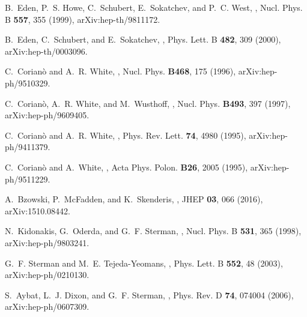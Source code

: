 \documentclass[a4paper,11pt,openright,twoside]{book}
\numberwithin{equation}{section}
\begin{document}
{{\begin{thebibliography}{100}
	B.~Eden, P.~S. Howe, C.~Schubert, E.~Sokatchev, and P.~C. West,
	,
	\newblock Nucl. Phys. B {\bf 557}, 355 (1999), arXiv:hep-th/9811172.
	
	B.~Eden, C.~Schubert, and E.~Sokatchev,
	,
	\newblock Phys. Lett. B {\bf 482}, 309 (2000), arXiv:hep-th/0003096.
	
	C.~Corian\`o and A.~R. White,
	,
	\newblock Nucl. Phys. {\bf B468}, 175 (1996), arXiv:hep-ph/9510329.
	
	C.~Corian\`o, A.~R. White, and M.~Wusthoff,
	,
	\newblock Nucl. Phys. {\bf B493}, 397 (1997), arXiv:hep-ph/9609405.
	
	C.~Corian\`o and A.~R. White,
	,
	\newblock Phys. Rev. Lett. {\bf 74}, 4980 (1995), arXiv:hep-ph/9411379.
	
	C.~Corian\`o and A.~White,
	,
	\newblock Acta Phys. Polon. {\bf B26}, 2005 (1995), arXiv:hep-ph/9511229.
	
	A.~Bzowski, P.~McFadden, and K.~Skenderis,
	,
	\newblock JHEP {\bf 03}, 066 (2016), arXiv:1510.08442.
	
	N.~Kidonakis, G.~Oderda, and G.~F. Sterman,
	,
	\newblock Nucl. Phys. B {\bf 531}, 365 (1998), arXiv:hep-ph/9803241.
	
	G.~F. Sterman and M.~E. Tejeda-Yeomans,
	,
	\newblock Phys. Lett. B {\bf 552}, 48 (2003), arXiv:hep-ph/0210130.
	
	S.~Aybat, L.~J. Dixon, and G.~F. Sterman,
	,
	\newblock Phys. Rev. D {\bf 74}, 074004 (2006), arXiv:hep-ph/0607309.
	

\end{thebibliography}}}
\end{document}
